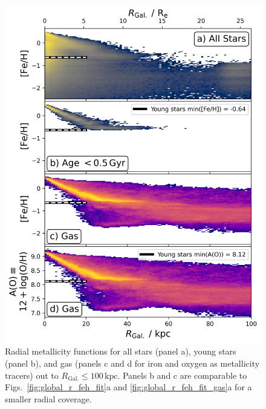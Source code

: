 \documentclass[twocolumn,apj,numberedappendix,appendixfloats]{openjournal}
\begin{document}
\begin{CJK*}{UTF8}{gbsn}
\begin{figure}
    \centering
    \includegraphics[width=\columnwidth]{figures/trace_stars_and_gas_100kpc.png}
    \caption{Radial metallicity functions for all stars (panel a), young stars (panel b), and gas (panels c and d for iron and oxygen as metallicity tracers) out to $R_\mathrm{Gal.} \leq 100\,\mathrm{kpc}$. Panels b and c are comparable to Figs.~\ref{fig:global_r_feh_fit}a and \ref{fig:global_r_feh_fit_gas}a for a smaller radial coverage.}
    \label{fig:trace_stars_and_gas_100kpc}
\end{figure}


\end{CJK*}
\end{document}
